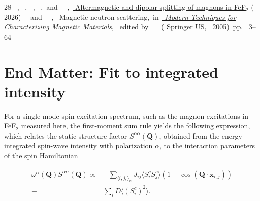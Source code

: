 \documentclass[aps, prl, twocolumn, superscriptaddress, longbibliography]{revtex4-2}
\begin{document}
\begin{thebibliography}{28}
  \BibitemOpen
   { {~},  {\ },  {~},  {\ },\ and\  {\ },\ }\href {https://doi.org/10.5281/zenodo.20029956} { {Altermagnetic and dipolar splitting of magnons in {FeF}$_2$}} ( {2026})
  \BibitemOpen
   { {\ }\ and\  {\ },\ } { {Magnetic neutron scattering},\ }in\ \href {http://dx.doi.org/10.1007/0-387-23395-4_1} {\emph { {Modern Techniques for Characterizing Magnetic Materials}}},\  {edited by\  {~}}\ ( {Springer US},\  {2005})\ pp.\  {3--64}
\end{thebibliography}



\clearpage
\appendix

\section{End Matter: Fit to integrated intensity}
\label{Appendix:Fit_intensity}
For a single-mode spin-excitation spectrum, such as the magnon excitations in FeF$_2$ measured here, the first-moment sum rule yields the following expression, which relates the static structure factor $S^{\alpha\alpha}(\bm{Q})$, obtained from the energy-integrated spin-wave intensity with polarization $\alpha$, to the interaction parameters of the spin Hamiltonian \cite{ZaliznyakLee_MNSChapter}

\begin{equation}
\begin{split}
\omega^{\alpha}(\bm{Q}) S^{\alpha\alpha}(\bm{Q}) \propto & - \sum_{\langle i, j, \rangle_n} J_{ij} \langle S^c_i S^c_j \rangle (1-\cos(\bm{Q} \cdot \bm{x}_{i,j})) \\
-& \sum_i D \langle (S_i^c)^2\rangle .
\end{split}
\label{eq2:1st_moment}
\end{equation}
\end{document}
